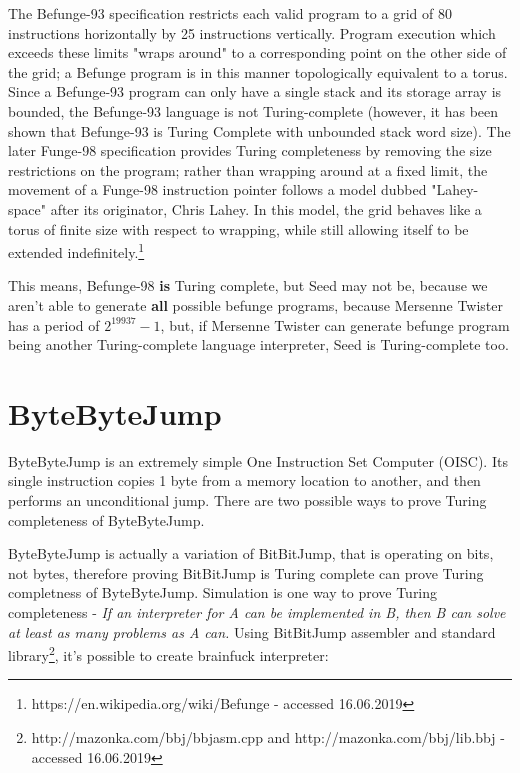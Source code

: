 \documentclass{article}
\begin{document}
\par The Befunge-93 specification restricts each valid program to a grid of 80 instructions horizontally by 25 instructions vertically. Program execution which exceeds these limits "wraps around" to a corresponding point on the other side of the grid; a Befunge program is in this manner topologically equivalent to a torus. Since a Befunge-93 program can only have a single stack and its storage array is bounded, the Befunge-93 language is not Turing-complete (however, it has been shown that Befunge-93 is Turing Complete with unbounded stack word size). The later Funge-98 specification provides Turing completeness by removing the size restrictions on the program; rather than wrapping around at a fixed limit, the movement of a Funge-98 instruction pointer follows a model dubbed "Lahey-space" after its originator, Chris Lahey. In this model, the grid behaves like a torus of finite size with respect to wrapping, while still allowing itself to be extended indefinitely.\footnote{https://en.wikipedia.org/wiki/Befunge - accessed 16.06.2019}

\par This means, Befunge-98 \textbf{is} Turing complete, but Seed may not be, because we aren't able to generate \textbf{all} possible befunge programs, because Mersenne Twister has a period of \begin{math}2^{19937} - 1\end{math}, but, if Mersenne Twister can generate befunge program being another Turing-complete language interpreter, Seed is Turing-complete too.

\section{ByteByteJump}
\par ByteByteJump is an extremely simple One Instruction Set Computer (OISC). Its single instruction copies 1 byte from a memory location to another, and then performs an unconditional jump. There are two possible ways to prove Turing completeness of ByteByteJump.

\par ByteByteJump is actually a variation of BitBitJump, that is operating on bits, not bytes, therefore proving BitBitJump is Turing complete can prove Turing completness of ByteByteJump. Simulation is one way to prove Turing completeness - \textit{If an interpreter for A can be implemented in B, then B can solve at least as many problems as A can.}
Using BitBitJump assembler and standard library\footnote{http://mazonka.com/bbj/bbjasm.cpp and http://mazonka.com/bbj/lib.bbj - accessed 16.06.2019}, it's possible to create brainfuck interpreter:
\end{document}
